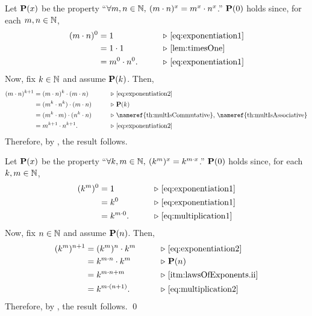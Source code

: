 \documentclass[../introduction_to_set_theory.tex]{subfiles}
\begin{document}
{\begin{enumerate}[nolistsep, label=(\roman*), leftmargin=*, listparindent=\parindent]
    \ii
    Let \(\bm{\mathrm{P}}(x)\) be the property ``\(\fall m, n \in \NN,\: (m \cdot n)^x = m^x \cdot n^x\).''
    \(\bm{\mathrm{P}}(0)\) holds since, for each \(m, n \in \NN\),
    \begin{alignat*}{2}
        (m \cdot n)^0 &= 1 &\qquad& \comment*{\eqref{eq:exponentiation1}}\\
                      &= 1 \cdot 1 && \comment*{\Cref{lem:timesOne}}\\
                      &= m^0 \cdot n^0. &&\comment*{\eqref{eq:exponentiation1}}
    \end{alignat*}
    Now, fix \(k \in \NN\) and assume \(\bm{\mathrm{P}}(k)\). Then,
    \begin{alignat*}{2}
        (m \cdot n)^{k+1} &= (m \cdot n)^k \cdot (m \cdot n) &\qquad& \comment*{\eqref{eq:exponentiation2}}\\
                          &= (m^k \cdot n^k) \cdot (m \cdot n) && \comment*{\(\mbf{P}(k)\)}\\
                          &= (m^k \cdot m) \cdot (n^k \cdot n) && \comment*{\nameref{th:multIsCommutative}, \nameref{th:multIsAssociative}}\\
                          &= m^{k+1} \cdot n^{k+1}. && \comment*{\eqref{eq:exponentiation2}}
    \end{alignat*}
    Therefore, by , the result follows.

    \ii
    Let \(\bm{\mathrm{P}}(x)\) be the property ``\(\fall k, m \in \NN,\: (k^m)^x = k^{m \cdot x}\).''
    \(\bm{\mathrm{P}}(0)\) holds since, for each \(k, m \in \NN\),
    \begin{alignat*}{2}
        (k^m)^0 &= 1 &\qquad& \comment*{\eqref{eq:exponentiation1}}\\
                &= k^0 && \comment*{\eqref{eq:exponentiation1}}\\
                &= k^{m \cdot 0}. && \comment*{\eqref{eq:multiplication1}}
    \end{alignat*}
    Now, fix \(n \in \NN\) and assume \(\bm{\mathrm{P}}(n)\). Then,
    \begin{alignat*}{2}
        (k^m)^{n+1} &= (k^m)^n \cdot k^m &\qquad& \comment*{\eqref{eq:exponentiation2}}\\
                    &= k^{m \cdot n} \cdot k^m && \comment*{\(\mbf{P}(n)\)}\\
                    &= k^{m \cdot n + m} && \comment*{\ref{itm:lawsOfExponents.ii}}\\
                    &= k^{m \cdot (n+1)}. && \comment*{\eqref{eq:multiplication2}}
    \end{alignat*}
    Therefore, by , the result follows.
    \qed
\end{enumerate}
}
\end{document}

